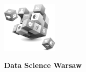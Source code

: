 \documentclass[\main/boa.tex]{subfiles}
\begin{document}
	
	\begin{minipage}[t]{0.915\textwidth}
		\center     
		\includegraphics[width=100px]{img/logos.bw/DSW_transparent.png} 
	\end{minipage}
	\begin{center}
	\Large \textbf {Data Science Warsaw}
	\end{center}
	
	\vskip 0.3cm
	\normalsize 

	\vskip 1.5cm
\end{document}
